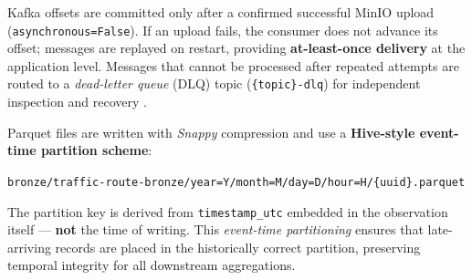   Kafka offsets are committed only after a confirmed successful MinIO                                                                                     
  upload (\texttt{asynchronous\allowbreak=False}). If an upload fails, the consumer                                                                                  
  does not advance its offset; messages are replayed on restart, providing                                                                                
  \textbf{at-least-once delivery} at the application level. Messages                                                                                      
  that cannot be processed after repeated attempts are routed to a                                                                                        
  \textit{dead-letter queue} (DLQ) topic (\texttt{\{topic\}-dlq}) for                                                                                     
  independent inspection and recovery \cite{enterprise_integration_patterns}.                                                                             
                                                                                                                                                          
  Parquet files are written with \textit{Snappy} compression and use                                                                                      
  a \textbf{Hive-style event-time partition scheme}:                                                                                                      
  \begin{center}                                                                                                                                          
  \texttt{bronze/traffic-route-bronze/year=Y/month=M/day=D/hour=H/\{uuid\}.parquet}
  \end{center}                                                                                                                                            
                  
  The partition key is derived from \texttt{timestamp\_utc} embedded in                                                                                   
  the observation itself — \textbf{not} the time of writing. This
  \textit{event-time partitioning} \cite{flink_event_time} ensures that                                                                                   
  late-arriving records are placed in the historically correct partition,                                                                                 
  preserving temporal integrity for all downstream aggregations.                                                                                          
                                                                                                                                                          
